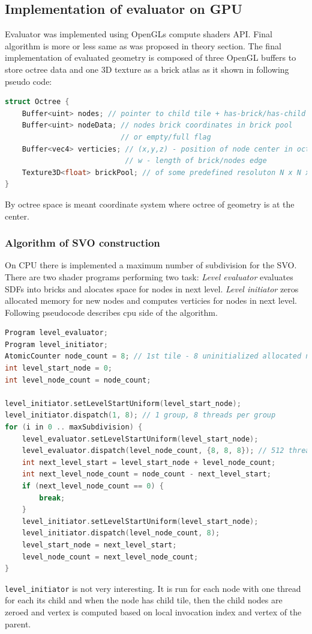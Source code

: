 \documentclass[11pt, a4paper]{article}
\begin{document}
\subsection{Implementation of evaluator on GPU}
Evaluator was implemented using OpenGLs compute shaders API.
Final algorithm is more or less same as was proposed in theory section.
The final implementation of evaluated geometry is composed of three OpenGL buffers to store octree data and one 3D texture as a brick atlas as it shown in following pseudo code:
\begin{lstlisting}[language=C++]
struct Octree {
    Buffer<uint> nodes; // pointer to child tile + has-brick/has-child flags
    Buffer<uint> nodeData; // nodes brick coordinates in brick pool
                           // or empty/full flag
    Buffer<vec4> verticies; // (x,y,z) - position of node center in octree space
                            // w - length of brick/nodes edge
    Texture3D<float> brickPool; // of some predefined resoluton N x N x N voxels
}
\end{lstlisting}
By octree space is meant coordinate system where octree of geometry is at the center.

\subsubsection{Algorithm of SVO construction}
On CPU there is implemented a maximum number of subdivision for the SVO.
There are two shader programs performing two task: \emph{Level evaluator} evaluates SDFs into bricks and alocates space for nodes in next level.
\emph{Level initiator} zeros allocated memory for new nodes and computes verticies for nodes in next level.
Following pseudocode describes cpu side of the algorithm.
\begin{lstlisting}[language=C++]
Program level_evaluator;
Program level_initiator;
AtomicCounter node_count = 8; // 1st tile - 8 uninitialized allocated nodes
int level_start_node = 0;
int level_node_count = node_count;

level_initiator.setLevelStartUniform(level_start_node);
level_initiator.dispatch(1, 8); // 1 group, 8 threads per group
for (i in 0 .. maxSubdivision) {
    level_evaluator.setLevelStartUniform(level_start_node);
    level_evaluator.dispatch(level_node_count, {8, 8, 8}); // 512 threads
    int next_level_start = level_start_node + level_node_count;
    int next_level_node_count = node_count - next_level_start;
    if (next_level_node_count == 0) {
        break;
    }
    level_initiator.setLevelStartUniform(level_start_node);
    level_initiator.dispatch(level_node_count, 8);
    level_start_node = next_level_start;
    level_node_count = next_level_node_count;
}
\end{lstlisting}
\texttt{level\_initiator} is not very interesting.
It is run for each node with one thread for each its child and when the node has child tile, then the child nodes are zeroed and vertex is computed based on local invocation index and vertex of the parent.
\end{document}
